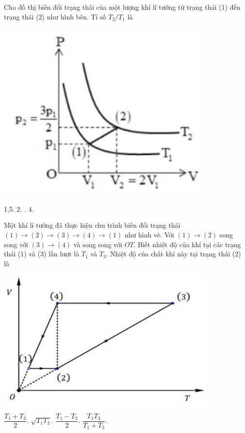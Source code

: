 \begin{ex}
	Cho đồ thị biến đổi trạng thái của một lượng khí lí tưởng từ trạng thái (1) đến trạng thái (2) như hình bên. Tỉ số $T_2/T_1$ là 
	\begin{center}
		\includegraphics[width=0.35\linewidth]{figs/VN12-Y24-PH-SYL-014P-2}
	\end{center}
	
	\choice
	{1,5.}
	{2.}
	{.}
	{4.}
\end{ex}
\begin{ex}
	Một khí lí tưởng đã thực hiện chu trình biến đổi trạng thái $(1)\rightarrow (2)\rightarrow(3)\rightarrow(4)\rightarrow(1)$ như hình vẽ. Với $(1)\rightarrow(2)$ song song với $(3)\rightarrow(4)$ và song song với $OT$. Biết nhiệt độ của khí tại các trạng thái (1) và (3) lần lượt là $T_1$ và $T_3$. Nhiệt độ của chất khí này tại trạng thái (2) là
	\begin{center}
		\includegraphics[width=0.45\linewidth]{figs/VN12-Y24-PH-SYL-014P-4}
	\end{center}
	
	\choice
	{$\dfrac{T_1+T_3}{2}$.}
	{\True $\sqrt{T_1T_3}$.}
	{$\dfrac{T_1-T_3}{2}$.}
	{$\dfrac{T_1T_3}{T_1+T_3}$.}
\end{ex}
